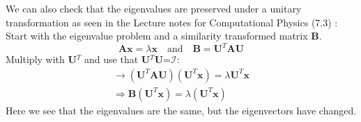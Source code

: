 \documentclass[12pt,a4paper,english]{article}
\begin{document}
We can also check that the eigenvalues are preserved under a unitary transformation as seen in the Lecture notes for Computational Physics (7.3) \cite{lectures}:\\
Start with the eigenvalue problem and a similarity transformed matrix \textbf{B}. 
\begin{equation}
\label{eq:sim_transf}
\textbf{Ax}=\lambda\textbf{x}\quad \text{and}\quad \textbf{B}=\textbf{U}^T\textbf{A}\textbf{U}
\end{equation}
Multiply with \textbf{U}$^T$ and use that \textbf{U}$^T$\textbf{U}=$\mathcal{I}$:
\begin{align*}
\rightarrow (\textbf{U}^T\textbf{A}\textbf{U})(\textbf{U}^T\textbf{x})=\lambda\textbf{U}^T\textbf{x}\\
\Rightarrow \textbf{B}(\textbf{U}^T\textbf{x})=\lambda(\textbf{U}^T\textbf{x})
\end{align*}
Here we see that the eigenvalues are the same, but the eigenvectors have changed.
\end{document}
